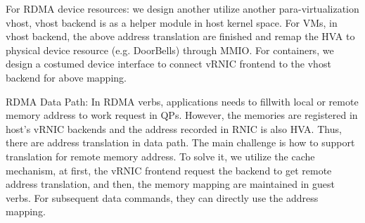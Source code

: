  For RDMA device resources: we design another utilize another para-virtualization vhost, vhost backend is as a helper module in host kernel space. For VMs, in vhost backend, the above address translation are finished  and remap the HVA to physical device resource (e.g. DoorBells) through MMIO. For containers, we design a costumed device interface to connect vRNIC frontend to the vhost backend for above mapping.
 
RDMA Data Path: In RDMA verbs, applications needs to fillwith local or remote memory address to work request in QPs. However, the memories are registered in host's vRNIC backends and the address recorded in RNIC is also HVA. Thus, there are address translation in data path. The main challenge is how to support translation for remote memory address. To solve it, we utilize the cache mechanism, at first, the vRNIC frontend request the backend to get remote address translation, and then, the memory mapping are maintained in guest verbs. For subsequent data commands, they can directly use the address mapping.
 

 